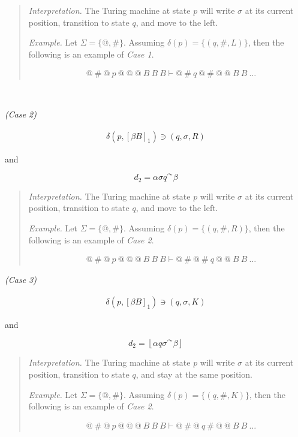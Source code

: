 \documentclass[a4paper, 12pt]{article}
\begin{document}
\small 
\begin{quote}
    \textit{Interpretation.} The Turing machine at state $p$ will write $\sigma$
    at its current position, transition to state $q$, and move to the left. 

    \textit{Example.} Let $\Sigma = \{ @, \#\}$. Assuming $\delta (p) = \{ (q,
    \#, L) \}$, then the following is an example of
    \textit{Case 1}.
    
    \begin{align*}
        &@ ~ \# ~ @ ~ p ~ @ ~ @ ~ @ ~ B ~ B ~ B \vdash  @ ~ \# ~q ~ @ ~ \# ~ @ ~ @ ~ B ~ B
        ~ \ldots
    \end{align*}
\end{quote}
\normalsize 

~ 

\textit{(Case 2)} 

\begin{align*}
    \delta \left( p, \left[ \beta B \right]_1  \right) \ni (q, \sigma, R)
\end{align*}

and 

$$d_2 = \alpha \sigma q {}^{\curvearrowright} \beta $$

\small 
\begin{quote}
    \textit{Interpretation.} The Turing machine at state $p$ will write $\sigma$
    at its current position, transition to state $q$, and move to the left. 

    \textit{Example.} Let $\Sigma = \{ @, \#\}$. Assuming $\delta (p) = \{ (q,
    \#, R) \}$, then the following is an example of
    \textit{Case 2}.
    
    \begin{align*}
        &@ ~ \# ~ @ ~ p ~ @ ~ @ ~ @ ~ B ~ B ~ B \vdash  @ ~ \# ~@ ~ \# ~ q ~ @ ~
        @~ B ~ B
        ~ \ldots
    \end{align*}
\end{quote}
\normalsize 


\textit{(Case 3)} 

\begin{align*}
    \delta \left( p, \left[ \beta B \right]_1  \right) \ni (q, \sigma, K)
\end{align*}

and 

$$d_2 = \left\lfloor \alpha q \sigma {}^{\curvearrowright} \beta  \right\rfloor $$

\small 
\begin{quote}
    \textit{Interpretation.} The Turing machine at state $p$ will write $\sigma$
    at its current position, transition to state $q$, and stay at the same
    position.

    \textit{Example.} Let $\Sigma = \{ @, \#\}$. Assuming $\delta (p) = \{ (q,
    \#, K) \}$, then the following is an example of
    \textit{Case 2}.
    
    \begin{align*}
        &@ ~ \# ~ @ ~ p ~ @ ~ @ ~ @ ~ B ~ B ~ B \vdash  @ ~ \# ~@ ~ q ~ \# ~  @ ~
        @~ B ~ B
        ~ \ldots
    \end{align*}
\end{quote}
\normalsize 
\end{document}
